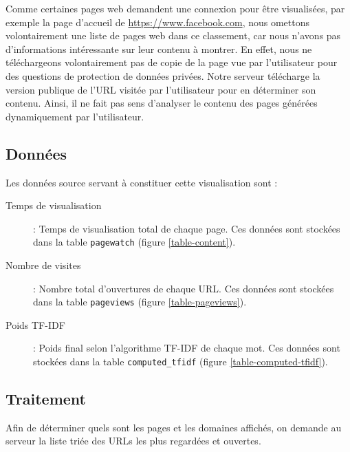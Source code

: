 		Comme certaines pages web demandent une connexion pour être visualisées, par exemple la page d'accueil de \url{https://www.facebook.com}, nous omettons volontairement une liste de pages web dans ce classement, car nous n'avons pas d'informations intéressante sur leur contenu à montrer. En effet, nous ne téléchargeons volontairement pas de copie de la page vue par l'utilisateur pour des questions de protection de données privées. Notre serveur télécharge la version publique de l'URL visitée par l'utilisateur pour en déterminer son contenu. Ainsi, il ne fait pas sens d'analyser le contenu des pages générées dynamiquement par l'utilisateur.

	\subsection{Données}

		Les données source servant à constituer cette visualisation sont :
		\begin{description}
			\item[Temps de visualisation] : Temps de visualisation total de chaque page. Ces données sont stockées dans la table \texttt{pagewatch} (figure \ref{table-content}).
			\item[Nombre de visites] : Nombre total d'ouvertures de chaque URL. Ces données sont stockées dans la table \texttt{pageviews} (figure \ref{table-pageviews}).
			\item[Poids TF-IDF] : Poids final selon l'algorithme TF-IDF de chaque mot. Ces données sont stockées dans la table \texttt{computed\_tfidf} (figure \ref{table-computed-tfidf}).
		\end{description}

	\subsection{Traitement}

		Afin de déterminer quels sont les pages et les domaines affichés, on demande au serveur la liste triée des URLs les plus regardées et ouvertes.

